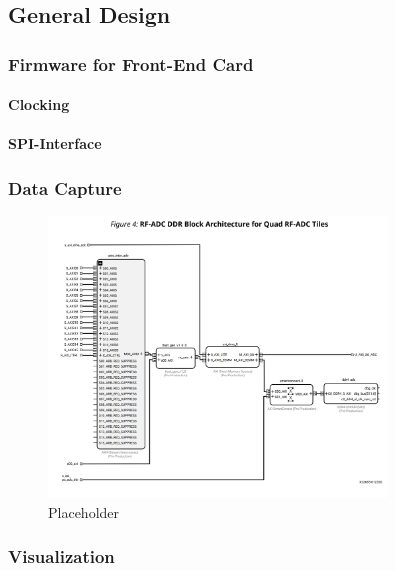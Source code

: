 \subsection{General Design}
\subsubsection{Firmware for Front-End Card}
\paragraph{Clocking}
\paragraph{SPI-Interface}
\subsubsection{Data Capture}
\begin{figure}[H]
	\centering
	\includegraphics[width = 0.8\textwidth]{chap/03-work/img/adc_cap}
	\caption{Placeholder}
	\label{fig:adccap}
\end{figure}

\subsubsection{Visualization}





